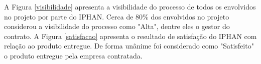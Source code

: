 A Figura \ref{visibilidade} apresenta a visibilidade do processo de todos os envolvidos no projeto por parte do IPHAN. Cerca de 80\% dos envolvidos no projeto considerou a visibilidade do processo como "Alta", dentre eles o gestor do contrato. A Figura \ref{satisfacao} apresenta o resultado de satisfação do IPHAN com relação ao produto entregue. De forma unânime foi considerado como "Satisfeito" o produto entregue pela empresa contratada. 


\begin{figure}[h]
\end{figure}



